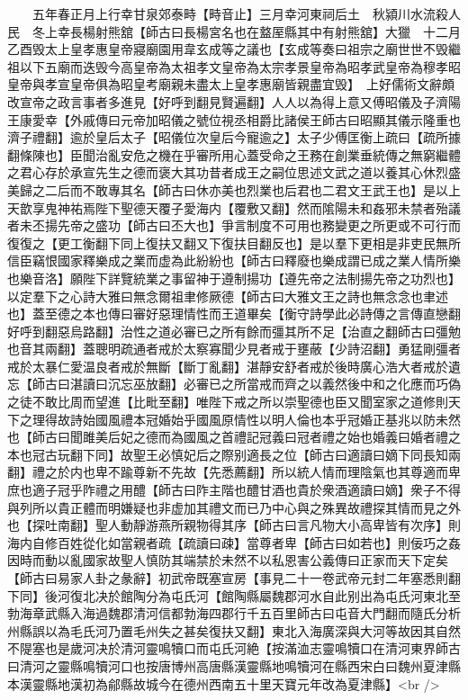 　　五年春正月上行幸甘泉郊泰畤【畤音止】三月幸河東祠后土　秋潁川水流殺人民　冬上幸長楊射熊舘【師古曰長楊宮名也在盩厔縣其中有射熊舘】大獵　十二月乙酉毁太上皇孝惠皇帝寢廟園用韋玄成等之議也【玄成等奏曰祖宗之廟世世不毁繼祖以下五廟而迭毁今高皇帝為太祖孝文皇帝為太宗孝景皇帝為昭孝武皇帝為穆孝昭皇帝與孝宣皇帝俱為昭皇考廟親未盡太上皇孝惠廟皆親盡宜毁】　上好儒術文辭頗改宣帝之政言事者多進見【好呼到翻見賢遍翻】人人以為得上意又傅昭儀及子濟陽王康愛幸【外戚傳曰元帝加昭儀之號位視丞相爵比諸侯王師古曰昭顯其儀示隆重也濟子禮翻】逾於皇后太子【昭儀位次皇后今寵逾之】太子少傅匡衡上疏曰【疏所據翻條陳也】臣聞治亂安危之機在乎審所用心蓋受命之王務在創業垂統傳之無窮繼體之君心存於承宣先生之德而褒大其功昔者成王之嗣位思述文武之道以養其心休烈盛美歸之二后而不敢專其名【師古曰休亦美也烈業也后君也二君文王武王也】是以上天歆享鬼神祐焉陛下聖德天覆子愛海内【覆敷又翻】然而隂陽未和姦邪未禁者殆議者未丕揚先帝之盛功【師古曰丕大也】爭言制度不可用也務變更之所更或不可行而復復之【更工衡翻下同上復扶又翻又下復扶目翻反也】是以羣下更相是非吏民無所信臣竊恨國家釋樂成之業而虚為此紛紛也【師古曰釋廢也樂成謂已成之業人情所樂也樂音洛】願陛下詳覽統業之事留神于遵制揚功【遵先帝之法制揚先帝之功烈也】以定羣下之心詩大雅曰無念爾祖聿修厥德【師古曰大雅文王之詩也無念念也聿述也】蓋至德之本也傳曰審好惡理情性而王道畢矣【衡守詩學此必詩傳之言傳直戀翻好呼到翻惡烏路翻】治性之道必審已之所有餘而彊其所不足【治直之翻師古曰彊勉也音其兩翻】蓋聰明疏通者戒於太察寡聞少見者戒于壅蔽【少詩沼翻】勇猛剛彊者戒於太暴仁愛温良者戒於無斷【斷丁亂翻】湛靜安舒者戒於後時廣心浩大者戒於遺忘【師古曰湛讀曰沉忘巫放翻】必審已之所當戒而齊之以義然後中和之化應而巧偽之徒不敢比周而望進【比毗至翻】唯陛下戒之所以崇聖德也臣又聞室家之道修則天下之理得故詩始國風禮本冠婚始乎國風原情性以明人倫也本乎冠婚正基兆以防未然也【師古曰聞雎美后妃之德而為國風之首禮記冠義曰冠者禮之始也婚義曰婚者禮之本也冠古玩翻下同】故聖王必慎妃后之際别適長之位【師古曰適讀曰嫡下同長知兩翻】禮之於内也卑不踰尊新不先故【先悉薦翻】所以統人情而理陰氣也其尊適而卑庶也適子冠乎阼禮之用醴【師古曰阼主階也醴甘酒也貴於衆酒適讀曰嫡】衆子不得與列所以貴正體而明嫌疑也非虚加其禮文而已乃中心與之殊異故禮探其情而見之外也【探吐南翻】聖人動靜游燕所親物得其序【師古曰言凡物大小高卑皆有次序】則海内自修百姓從化如當親者疏【疏讀曰疎】當尊者卑【師古曰如若也】則佞巧之姦因時而動以亂國家故聖人慎防其端禁於未然不以私恩害公義傳曰正家而天下定矣【師古曰易家人卦之彖辭】初武帝既塞宣房【事見二十一卷武帝元封二年塞悉則翻下同】後河復北决於館陶分為屯氏河【館陶縣屬魏郡河水自此别出為屯氏河東北至勃海章武縣入海過魏郡清河信都勃海四郡行千五百里師古曰屯音大門翻而隨氏分析州縣誤以為毛氏河乃置毛州失之甚矣復扶又翻】東北入海廣深與大河等故因其自然不隄塞也是歲河决於清河靈鳴犢口而屯氏河絶【按滿洫志靈鳴犢口在清河東界師古曰清河之靈縣鳴犢河口也按唐博州高唐縣漢靈縣地鳴犢河在縣西宋白曰魏州夏津縣本漢靈縣地漢初為鄃縣故城今在德州西南五十里天寶元年改為夏津縣】<br />
